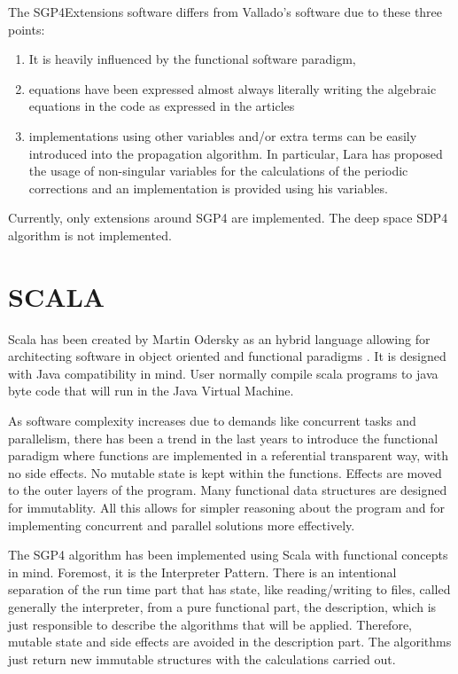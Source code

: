 \documentclass{article}
\begin{document}
The SGP4Extensions software differs from Vallado's software due to these three points:
\begin{enumerate}
  \item  It is heavily influenced by the functional software paradigm,
  \item  equations have been expressed almost always literally writing the algebraic
equations in the code as expressed in the articles
  \item  implementations using other variables and/or extra terms can be easily introduced
into the propagation algorithm. In particular, Lara has proposed the usage of non-singular variables for the
calculations of the periodic corrections and an implementation is provided using his variables.
\end{enumerate}

Currently, only extensions around SGP4 are implemented. The deep space SDP4 algorithm is not
implemented.

\section{SCALA}
\label{sec:scala}

Scala has been created by Martin Odersky as an hybrid language allowing for architecting software in
object oriented and functional paradigms \cite{scala-overview-tech-report}.
It is designed with Java compatibility in mind. User normally compile scala programs
to java byte code that will run in the Java Virtual Machine.

As software complexity increases due to demands like concurrent tasks and parallelism,
there has been a trend in the last years to introduce the functional paradigm where
functions are implemented in a referential transparent way, with no side effects.
No mutable state is kept within the functions. Effects are moved to the outer layers
of the program. Many functional data structures are designed for immutablity.
All this allows for simpler reasoning about the program and for
implementing concurrent and parallel solutions more effectively.

The SGP4 algorithm has been implemented using Scala with functional concepts
in mind. Foremost, it is the Interpreter Pattern. There is an intentional
separation of the run time part that has state, like reading/writing to files, called
generally the interpreter, from a pure functional part, the description, which is just
responsible to describe the algorithms that will be applied.
Therefore, mutable state and side effects are avoided in the description part.
The algorithms just return new immutable structures
with the calculations carried out.
\end{document}
